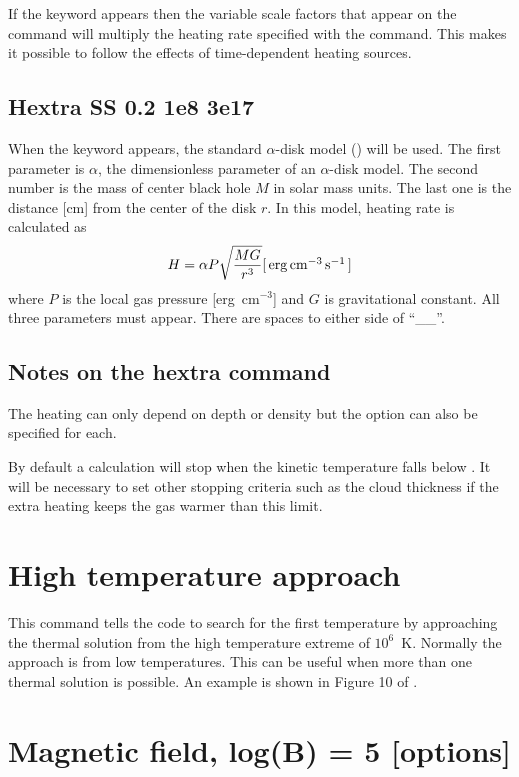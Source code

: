 If the  keyword appears then the variable
scale factors that appear
on the  command will multiply the heating
rate specified with the  command.
This makes it possible to follow
the effects of time-dependent heating sources.

\subsection{Hextra SS 0.2 1e8 3e17}

When the keyword  appears, the standard $\alpha$-disk model
(\citet{Shakura1973}) will be used. The first parameter is $\alpha$, 
the dimensionless parameter of an $\alpha$-disk model. 
The second number is the mass of center black hole $M$ in solar mass units. 
The last one is the distance [cm] from the center of the disk $r$. 
In this model, heating rate is calculated as
\begin{equation}
H=\alpha P\sqrt{\frac{MG}{r^3}}[\mbox{${\rm\thinspace erg}{\rm\thinspace cm}^{-3}{\rm\thinspace s}^{-1}\,$}]
\end{equation}
where $P$ is the local gas pressure [erg~cm$^{-3}$] 
and $G$ is gravitational constant. 
All three parameters must appear.
There are spaces to either side of
``\_\_''. 

\subsection{Notes on the hextra command}

The heating can only depend on depth or density
but the  option can
also be specified for each.

By default a calculation will stop when the kinetic temperature falls
below \TEMPSTOPDEFAULT.  It will be necessary to set other stopping criteria such
as the cloud thickness if the extra heating keeps the gas warmer than this
limit.

\section{High temperature approach}

This command tells the code to search for the first temperature by
approaching the thermal solution from the high temperature extreme of $10^6$~K.
Normally the approach is from low temperatures.
This can be useful
when more than one thermal solution is possible.
An example is shown in Figure 10 of \citet{FerlandFabian2009}.

\section{Magnetic field, log(B) = 5 [options]}

